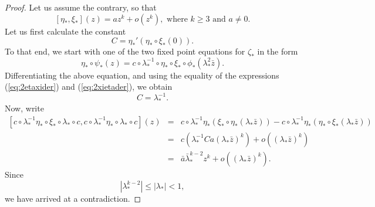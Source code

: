 \begin{proof}

Let us assume the contrary, so that
$$[\eta_*,\xi_*](z) = az^k+o(z^k),\text{ where }k\geq 3\text{ and }a\neq 0.$$
Let us first calculate the constant 
$$C=\eta_*'(\eta_*\circ \xi_*(0)).$$
To that end, we start with one of the two fixed point equations for $\zeta_*$ in the form
$$\eta_*\circ\psi_*(z)=c\circ \lambda_*^{-1}\circ\eta_*\circ\xi_* \circ\phi_*(\lambda_*^2\bar{z}).$$
Differentiating the above equation, and using the equality of the expressions (\ref{eq:2etaxider}) and (\ref{eq:2xietader}),
we obtain $$C=\lambda_*^{-1}.$$
Now, write
\begin{eqnarray}
\nonumber [c\circ \! \lambda_*^{-1}\eta_*\circ\xi_* \circ \lambda_* \circ c,c \circ \! \lambda_*^{-1}\eta_* \circ \lambda_* \circ c](z)\!\!&\!\!=\!\!&\!\!c\circ \! \lambda_*^{-1}\eta_*(\xi_*\circ\eta_*(\lambda_* \bar z))-c\circ \! \lambda_*^{-1}\eta_*(\eta_*\circ\xi_*(\lambda_* \bar z))\\
\nonumber \!\!& \!\! = \!\!& \!\!c(\lambda_*^{-1}C a (\lambda_*\bar z)^k)+o((\lambda_*\bar z)^k) \\
\nonumber \!\!& \!\! = \!\!& \!\!\bar{a} \bar{\lambda}_*^{k-2} z^k+o((\lambda_*\bar z)^k).
\end{eqnarray}
Since $$|\lambda_*^{k-2}|\leq|\lambda_*| < 1,$$
we have arrived at a contradiction.
\end{proof}
